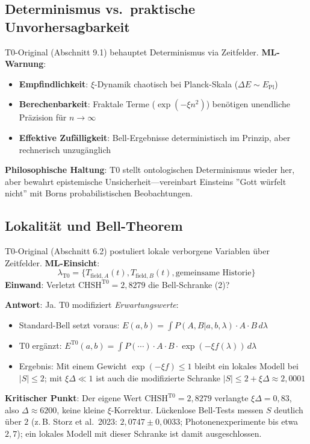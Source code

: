 	\subsection{Determinismus vs.~praktische Unvorhersagbarkeit}
	
	T0-Original (Abschnitt 9.1) behauptet Determinismus via Zeitfelder. \textbf{ML-Warnung}:
	\begin{itemize}
		\item \textbf{Empfindlichkeit}: $\xi$-Dynamik chaotisch bei Planck-Skala ($\Delta E \sim E_{\text{Pl}}$)
		\item \textbf{Berechenbarkeit}: Fraktale Terme ($\exp(-\xi n^2)$) benötigen unendliche Präzision für $n\to\infty$
		\item \textbf{Effektive Zufälligkeit}: Bell-Ergebnisse deterministisch im Prinzip, aber rechnerisch unzugänglich
	\end{itemize}
	\textbf{Philosophische Haltung}: T0 stellt ontologischen Determinismus wieder her, aber bewahrt epistemische Unsicherheit—vereinbart Einsteins ''Gott würfelt nicht'' mit Borns probabilistischen Beobachtungen.
	
		
	\subsection{Lokalität und Bell-Theorem}
	
	T0-Original (Abschnitt 6.2) postuliert lokale verborgene Variablen über Zeitfelder. \textbf{ML-Einsicht}:
	\begin{equation}
		\lambda_{\text{T0}} = \{T_{\text{field},A}(t), T_{\text{field},B}(t), \text{gemeinsame Historie}\} \tag{ML-Gl.~7.1}
	\end{equation}
	\textbf{Einwand}: Verletzt $\text{CHSH}^{\text{T0}}=2{,}8279$ die Bell-Schranke (2)?
	
	\textbf{Antwort}: Ja. T0 modifiziert \textit{Erwartungswerte}:
	\begin{itemize}
		\item Standard-Bell setzt voraus: $E(a,b) = \int P(A,B|a,b,\lambda) \cdot A \cdot B \, d\lambda$
		\item T0 ergänzt: $E^{\text{T0}}(a,b) = \int P(\cdots) \cdot A \cdot B \cdot \exp(-\xi f(\lambda)) \, d\lambda$
		\item Ergebnis: Mit einem Gewicht $\exp(-\xi f) \leq 1$ bleibt ein lokales Modell bei $|S| \leq 2$; mit $\xi\Delta \ll 1$ ist auch die modifizierte Schranke $|S| \leq 2 + \xi\Delta \approx 2{,}0001$
	\end{itemize}
	\textbf{Kritischer Punkt}: Der eigene Wert $\text{CHSH}^{\text{T0}} = 2{,}8279$ verlangte $\xi\Delta = 0{,}83$, also $\Delta \approx 6200$, keine kleine $\xi$-Korrektur. Lückenlose Bell-Tests messen $S$ deutlich über $2$ (z.\,B. Storz et al.\ 2023: $2{,}0747 \pm 0{,}0033$; Photonenexperimente bis etwa $2{,}7$); ein lokales Modell mit dieser Schranke ist damit ausgeschlossen.
	

